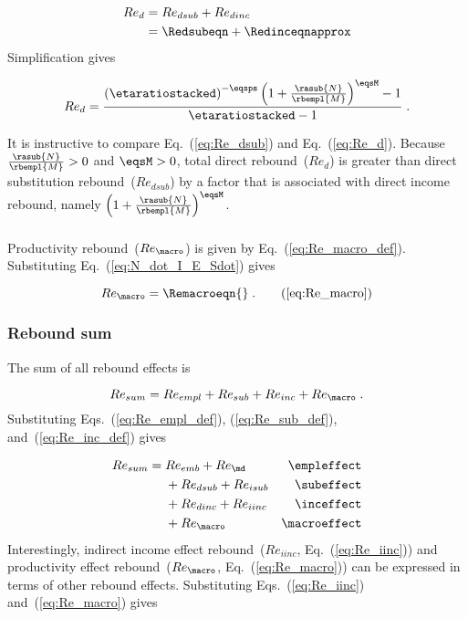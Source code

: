 \begin{align} 
  Re_d &= Re_{dsub} + Re_{dinc} \nonumber \\
       &= \Redsubeqn + \Redinceqnapprox
\end{align}
%
Simplification gives

\begin{equation} \label{eq:Re_d}
  Re_d = \frac{ \left( \etaratiostacked \right)^{-\eqsps}
             \left( 1 + \frac{\rasub{N}}{\rbempl{M}} \right)^{\eqsM}   - 1}
         {\etaratiostacked - 1} \; .
\end{equation}

It is instructive to compare Eq.~(\ref{eq:Re_dsub}) and Eq.~(\ref{eq:Re_d}).
Because 
$\frac{\rasub{N}}{\rbempl{M}} > 0$ and 
$\eqsM > 0$,
total direct rebound~($Re_d$) is greater than 
direct substitution rebound~($Re_{dsub}$) by a factor
that is associated with direct income rebound, namely
$\left( 1 + \frac{\rasub{N}}{\rbempl{M}} \right)^{\eqsM}$.


\subsubsection{\Macroeffect{}} 
\label{sec:Re_prod}

Productivity rebound~($Re_{\macro}$) is given by Eq.~(\ref{eq:Re_macro_def}).
Substituting Eq.~(\ref{eq:N_dot_I_E_Sdot}) gives

\begin{equation}
  Re_{\macro} = \Remacroeqn{} \; . \tag{\ref{eq:Re_macro}}
\end{equation}


\subsubsection{Rebound sum} 
\label{sec:total_rebound}

The sum of all rebound effects is 

\begin{equation}
  Re_{sum} = Re_{empl} + Re_{sub} + Re_{inc} + Re_{\macro} \; .
\end{equation}
%
Substituting Eqs.~(\ref{eq:Re_empl_def}), (\ref{eq:Re_sub_def}), and~(\ref{eq:Re_inc_def}) gives

\begin{align}
  Re_{sum} = \; &Re_{emb} + Re_{\md}      & \mathrm{\empleffect} \nonumber \\
                &+ Re_{dsub} + Re_{isub}   & \mathrm{\subeffect}  \nonumber \\
                &+ Re_{dinc} + Re_{iinc}   & \mathrm{\inceffect}  \nonumber \\
                &+ Re_{\macro}               & \mathrm{\macroeffect}
\end{align}
%
Interestingly, 
indirect income effect rebound~($Re_{iinc}$, Eq.~(\ref{eq:Re_iinc})) and
productivity effect rebound~($Re_{\macro}$, Eq.~(\ref{eq:Re_macro}))
can be expressed in terms of other rebound effects.
Substituting Eqs.~(\ref{eq:Re_iinc}) and~(\ref{eq:Re_macro}) gives

